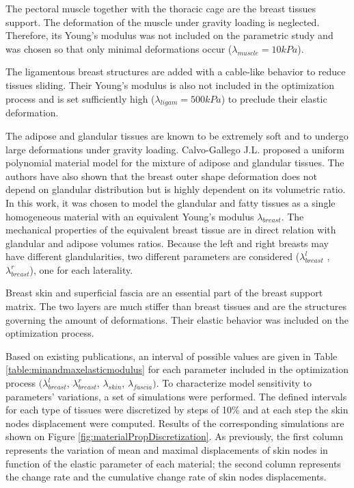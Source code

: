 The pectoral muscle together with the thoracic cage are the breast tissues support. The deformation of the muscle under gravity loading is neglected. Therefore, its Young's modulus was not included on the parametric study and was chosen so that only minimal deformations occur ($\lambda_{muscle}=10kPa$).

The ligamentous breast structures are added with a cable-like behavior to reduce tissues sliding. Their Young's modulus is also not included in the optimization process and is set sufficiently high ($\lambda_{ligam}=500kPa$) to preclude their elastic deformation. 

The adipose and glandular tissues are known to be extremely soft and to undergo large deformations under gravity loading. Calvo-Gallego J.L. \citep{calvo_polynomial_2015} proposed a uniform polynomial material model for the mixture of adipose and glandular tissues. The authors have also shown that the breast outer shape deformation does not depend on glandular distribution but is highly dependent on its volumetric ratio. In this work,  it was chosen to model the glandular and fatty tissues as a single homogeneous material with an equivalent Young's modulus $\lambda_{breast }$. The mechanical properties of the equivalent breast tissue are in direct relation with glandular and adipose volumes ratios. Because the left and right breasts may have different glandularities, two different parameters are considered ($\lambda_{breast}^l$ , $\lambda_{breast}^r$), one for each laterality.

Breast skin and superficial fascia are an essential part of the breast support matrix. The two layers are much stiffer than breast tissues and are the structures governing the amount of deformations. Their elastic behavior was included on the optimization process.

 Based on existing publications, an interval of possible values are given in Table \ref{table:minandmaxelasticmodulus} for each parameter included in the optimization process $(\lambda_{breast}^l$, $\lambda_{breast}^r$, $\lambda_{skin}$, $\lambda_{fascia})$. To characterize model sensitivity to parameters' variations, a set of simulations were performed. The defined intervals for each type of tissues were discretized by steps of 10\% and at each step the skin nodes displacement were computed. Results of the corresponding simulations are shown on Figure  \ref{fig:materialPropDiscretization}. As previously, the first column represents the variation of mean and maximal displacements of skin nodes in function of the elastic parameter of each material; the second column represents the change rate and the cumulative change rate of skin nodes displacements.


